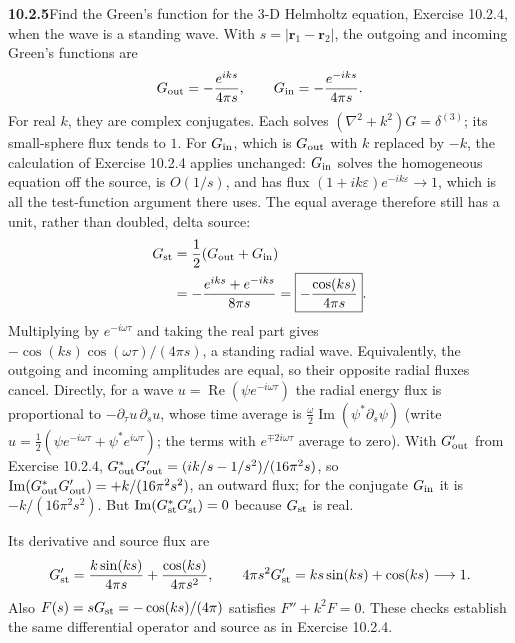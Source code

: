 \par\bigskip
\noindent\textbf{10.2.5}\quad Find the Green's function for the 3-D Helmholtz
equation, Exercise 10.2.4, when the wave is a standing wave.
\solution
With $s=|\mathbf r_1-\mathbf r_2|$, the outgoing and incoming
Green's functions are
\[
G_{\rm out}=-\frac{e^{iks}}{4\pi s},\qquad
G_{\rm in}=-\frac{e^{-iks}}{4\pi s}.
\]
For real $k$, they are complex conjugates. Each solves
$(\nabla^2+k^2)G=\delta^{(3)}$; its small-sphere flux tends to $1$.
For $G_{\rm in}$, which is $G_{\rm out}$ with $k$ replaced by $-k$,
the calculation of Exercise 10.2.4 applies unchanged: $G_{\rm in}$
solves the homogeneous equation off the source, is $O(1/s)$, and has
flux $(1+ik\varepsilon)e^{-ik\varepsilon}\to1$, which is all the
test-function argument there uses.
The equal average therefore still has a unit, rather than doubled,
delta source:
\begin{align*}
G_{\rm st}&=\frac12(G_{\rm out}+G_{\rm in})\\
&=-\frac{e^{iks}+e^{-iks}}{8\pi s}
=\boxed{-\frac{\cos(ks)}{4\pi s}}.
\end{align*}
Multiplying by $e^{-i\omega\tau}$ and taking the real part gives
$-\cos(ks)\cos(\omega\tau)/(4\pi s)$, a standing radial wave.
Equivalently, the outgoing and incoming amplitudes are equal, so their
opposite radial fluxes cancel. Directly, for a wave
$u=\operatorname{Re}(\psi e^{-i\omega\tau})$ the radial energy flux is
proportional to $-\partial_\tau u\,\partial_su$, whose time average is
$\frac\omega2\operatorname{Im}(\psi^*\partial_s\psi)$ (write
$u=\frac12(\psi e^{-i\omega\tau}+\psi^*e^{i\omega\tau})$; the terms with
$e^{\mp2i\omega\tau}$ average to zero). With $G_{\rm out}'$ from
Exercise 10.2.4, $G_{\rm out}^*G_{\rm out}'=(ik/s-1/s^2)/(16\pi^2s)$, so
$\operatorname{Im}(G_{\rm out}^*G_{\rm out}')=+k/(16\pi^2s^2)$, an
outward flux; for the conjugate $G_{\rm in}$ it is $-k/(16\pi^2s^2)$.
But $\operatorname{Im}(G_{\rm st}^*G_{\rm st}')=0$ because
$G_{\rm st}$ is real.

Its derivative and source flux are
\[
G_{\rm st}'=\frac{k\sin(ks)}{4\pi s}
+\frac{\cos(ks)}{4\pi s^2},\qquad
4\pi s^2G_{\rm st}'=ks\sin(ks)+\cos(ks)\longrightarrow1.
\]
Also $F(s)=sG_{\rm st}=-\cos(ks)/(4\pi)$ satisfies $F''+k^2F=0$.
These checks establish the same differential operator and source as in
Exercise 10.2.4.

